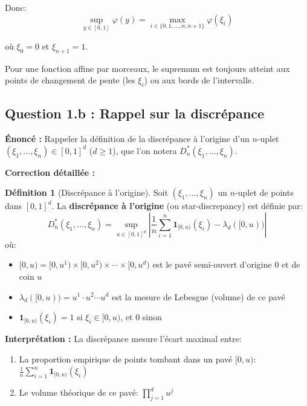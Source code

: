 \documentclass[12pt,a4paper]{article}
\theoremstyle{definition}
\newtheorem{definition}{Définition}[section]
\newcommand{\ind}{\mathbf{1}}
\begin{document}
Donc:
\[
\sup_{y \in [0,1]} \varphi(y) = \max_{i \in \{0, 1, \ldots, n, n+1\}} \varphi(\xi_i)
\]

où $\xi_0 = 0$ et $\xi_{n+1} = 1$.

\begin{astuce}
Pour une fonction affine par morceaux, le supremum est toujours atteint aux points de changement de pente (les $\xi_i$) ou aux bords de l'intervalle.
\end{astuce}

\subsection{Question 1.b : Rappel sur la discrépance}

\textbf{Énoncé :} Rappeler la définition de la discrépance à l'origine d'un $n$-uplet $(\xi_1, \ldots, \xi_n) \in [0,1]^d$ ($d \geq 1$), que l'on notera $D_n^*(\xi_1, \ldots, \xi_n)$.

\textbf{Correction détaillée :}

\begin{definition}[Discrépance à l'origine]
Soit $(\xi_1, \ldots, \xi_n)$ un $n$-uplet de points dans $[0,1]^d$. La \textbf{discrépance à l'origine} (ou star-discrepancy) est définie par:
\[
D_n^*(\xi_1, \ldots, \xi_n) = \sup_{u \in [0,1]^d} \left| \frac{1}{n} \sum_{i=1}^{n} \ind_{[0,u)}(\xi_i) - \lambda_d([0,u)) \right|
\]
où:
\begin{itemize}
    \item $[0,u) = [0,u^1) \times [0,u^2) \times \cdots \times [0,u^d)$ est le pavé semi-ouvert d'origine $0$ et de coin $u$
    \item $\lambda_d([0,u)) = u^1 \cdot u^2 \cdots u^d$ est la mesure de Lebesgue (volume) de ce pavé
    \item $\ind_{[0,u)}(\xi_i) = 1$ si $\xi_i \in [0,u)$, et $0$ sinon
\end{itemize}
\end{definition}

\textbf{Interprétation :} La discrépance mesure l'écart maximal entre:
\begin{enumerate}
    \item La proportion empirique de points tombant dans un pavé $[0,u)$: $\frac{1}{n}\sum_{i=1}^n \ind_{[0,u)}(\xi_i)$
    \item Le volume théorique de ce pavé: $\prod_{j=1}^d u^j$
\end{enumerate}
\end{document}

